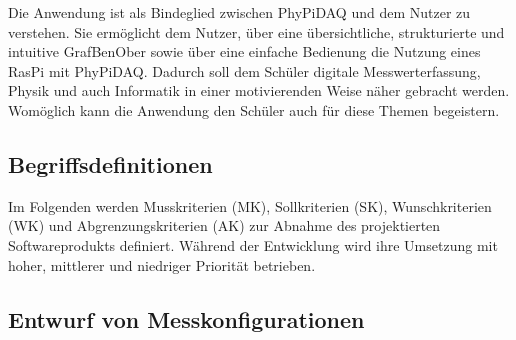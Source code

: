 \documentclass[parskip=full]{scrartcl}
\begin{document}
Die Anwendung ist als Bindeglied zwischen \gls{PhyPiDAQ} und dem Nutzer zu verstehen. Sie ermöglicht dem Nutzer, über eine übersichtliche, strukturierte und intuitive \gls{GrafBenOber} sowie über eine einfache Bedienung die Nutzung eines \gls{RasPi} mit \gls{PhyPiDAQ}. Dadurch soll dem Schüler digitale Messwerterfassung, Physik und auch Informatik in einer motivierenden Weise näher gebracht werden. Womöglich kann die Anwendung den Schüler auch für diese Themen begeistern.  

\subsection{Begriffsdefinitionen}

Im Folgenden werden \gls{Musskriterien} (MK), \gls{Sollkriterien} (SK), \gls{Wunschkriterien} (WK) und \gls{Abgrenzungskriterien} (AK) zur Abnahme des projektierten Softwareprodukts definiert. Während der Entwicklung wird ihre Umsetzung mit hoher, mittlerer und niedriger Priorität betrieben.

\newtheorem{MussKrit}{MK}
\newtheorem{SollKrit}{SK}
\newtheorem{WunschKrit}{WK}


\subsection{Entwurf von Messkonfigurationen}
\end{document}
